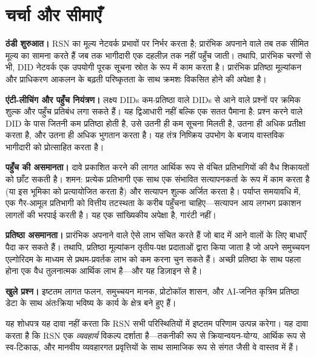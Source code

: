 \documentclass[11pt,a4paper,twocolumn]{article}
\begin{document}
\section{चर्चा और सीमाएँ}

\textbf{ठंडी शुरुआत।} RSN का मूल्य नेटवर्क प्रभावों पर निर्भर करता है; प्रारंभिक अपनाने वाले तब तक सीमित मूल्य का सामना करते हैं जब तक भागीदारी एक दहलीज़ तक नहीं पहुँच जाती। तथापि, प्रारंभिक चरणों से भी, DID नेटवर्क एक उपयोगी पूरक सूचना स्रोत के रूप में काम करता है। प्रारंभिक प्रतिष्ठा मूल्यांकन और प्राधिकरण आकलन के बढ़ती परिष्कृतता के साथ क्रमशः विकसित होने की अपेक्षा है।

\textbf{एंटी-लीचिंग और पहुँच नियंत्रण।} लक्ष्य DIDs कम-प्रतिष्ठा वाले DIDs से आने वाले प्रश्नों पर क्रमिक शुल्क और पहुँच प्रतिबंध लगा सकते हैं। यह द्विआधारी नहीं बल्कि एक सतत पैमाना है: प्रश्न करने वाले DID के पास जितनी कम प्रतिष्ठा होती है, उसे उतनी ही कम सूचना मिलती है, उतना ही अधिक प्रतीक्षा करता है, और उतना ही अधिक भुगतान करता है। यह तंत्र निष्क्रिय उपभोग के बजाय वास्तविक भागीदारी को प्रोत्साहित करता है।

\textbf{पहुँच की असमानता।} दावे प्रकाशित करने की लागत आर्थिक रूप से वंचित प्रतिभागियों की वैध शिकायतों को छाँट सकती है। शमन: प्रत्येक प्रतिभागी एक साथ एक संभावित सत्यापनकर्ता के रूप में काम करता है (या इस भूमिका को प्रत्यायोजित करता है) और सत्यापन शुल्क अर्जित करता है। पर्याप्त समयावधि में, एक गैर-आमूल प्रतिभागी को वित्तीय तटस्थता के करीब पहुँचना चाहिए---सत्यापन आय लगभग प्रकाशन लागतों की भरपाई करती है। यह एक सांख्यिकीय अपेक्षा है, गारंटी नहीं।

\textbf{प्रतिष्ठा असमानता।} प्रारंभिक अपनाने वाले ऐसे लाभ संचित करते हैं जो बाद में आने वालों के लिए बाधाएँ पैदा कर सकते हैं। तथापि, प्रतिष्ठा मूल्यांकन तृतीय-पक्ष प्रदाताओं द्वारा किया जाता है जो अपने समुच्चयन एल्गोरिदम के माध्यम से प्रथम-प्रवर्तक लाभ को कम करना चुन सकते हैं। अच्छी प्रतिष्ठा के साथ पहला होना एक वैध तुलनात्मक आर्थिक लाभ है---और यह डिज़ाइन से है।

\textbf{खुले प्रश्न।} इष्टतम लागत फलन, समुच्चयन मानक, प्रोटोकॉल शासन, और AI-जनित कृत्रिम प्रतिष्ठा डेटा के साथ अंतःक्रिया भविष्य के कार्य के क्षेत्र बने हुए हैं।

यह शोधपत्र यह दावा नहीं करता कि RSN सभी परिस्थितियों में इष्टतम परिणाम उत्पन्न करेगा। यह दावा करता है कि RSN एक \emph{व्यवहार्य} विकल्प दर्शाता है---तकनीकी रूप से क्रियान्वयन-योग्य, आर्थिक रूप से स्व-टिकाऊ, और मानवीय व्यवहारगत प्रवृत्तियों के साथ सामाजिक रूप से संगत जैसी वे वास्तव में हैं।
\end{document}
